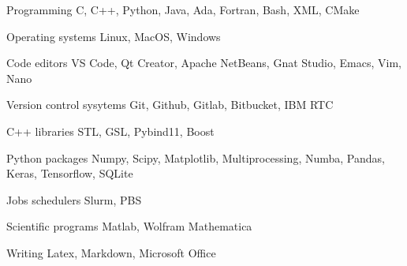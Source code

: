 

\begin{cvskills}

    \cvskill
    {Programming} %
    {C, C++, Python, Java, Ada, Fortran, Bash, XML, CMake} %

    \cvskill
    {Operating systems} %
    {Linux, MacOS, Windows} %

    \cvskill
    {Code editors} %
    {VS Code, Qt Creator, Apache NetBeans, Gnat Studio, Emacs, Vim, Nano} %


    \cvskill
    {Version control sysytems} %
    {Git, Github, Gitlab, Bitbucket, IBM RTC} %

    \cvskill
    {C++ libraries} %
    {STL, GSL, Pybind11, Boost}
    

    \cvskill
    {Python packages} %
    {Numpy, Scipy, Matplotlib, Multiprocessing, Numba, Pandas, Keras, Tensorflow, SQLite}

    \cvskill
    {Jobs schedulers} %
    {Slurm, PBS}
    
    \cvskill
    {Scientific programs} %
    {Matlab, Wolfram Mathematica} %

    \cvskill
    {Writing} %
    {Latex, Markdown, Microsoft Office} %

\end{cvskills}